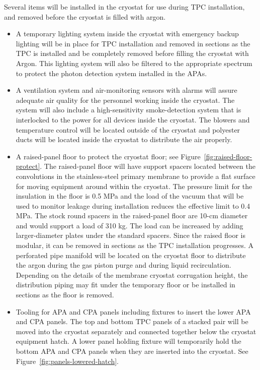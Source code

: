 Several items will be installed in the cryostat for use during TPC installation, and removed before the cryostat is filled with argon. 
\begin{itemize}
\item A temporary lighting system inside the cryostat with emergency backup lighting will be in place for TPC installation and removed in sections as the TPC is installed and be completely removed before filling the cryostat with Argon. This lighting system will also be filtered to the appropriate spectrum to protect the photon detection system installed in the APAs.  
\item A ventilation system and air-monitoring sensors with alarms will assure adequate air quality for the personnel working inside the cryostat. The system will also include a high-sensitivity smoke-detection system that is interlocked to the power for all devices inside the cryostat. The blowers and temperature control will be located outside of the cryostat and polyester ducts will be located inside the cryostat to distribute the air properly. 
\item A raised-panel floor to protect the cryostat floor; see Figure~\ref{fig:raised-floor-protect}. The raised-panel floor will have support spacers located between the convolutions in the stainless-steel primary membrane to provide a flat surface for moving equipment around within the cryostat. The pressure limit for the insulation in the floor is 0.5 MPa and the load of the vacuum that will be used to monitor leakage during installation reduces the effective limit to 0.4 MPa. The stock round spacers in the raised-panel floor are 10-cm diameter and would support a load of 310 kg. The load can be increased by adding larger-diameter plates under the standard spacers. Since the raised floor is modular, it can be removed in sections as the TPC installation progresses. A perforated pipe manifold will be located on the cryostat floor to distribute the argon during the gas piston purge and during liquid recirculation. Depending on the details of the membrane cryostat corrugation height, the distribution piping may fit under the temporary floor or be installed in sections as the floor is removed. 
\item Tooling for APA and CPA panels including fixtures to insert the lower APA and CPA panels. The top and bottom TPC panels of a stacked pair will be moved into the cryostat separately and connected together below the cryostat equipment hatch. A lower panel holding fixture will temporarily hold the bottom APA and CPA panels when they are inserted into the cryostat. See Figure~\ref{fig:panels-lowered-hatch}. 

\end{itemize}
